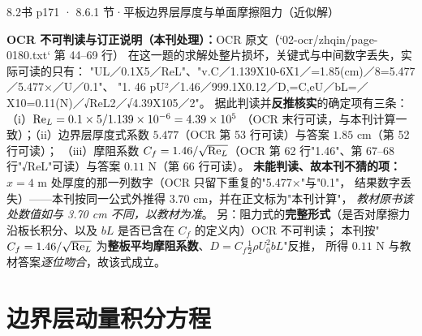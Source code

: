 \begin{liti}{8.2}{书 p171 · 8.6.1 节·平板边界层厚度与单面摩擦阻力（近似解）}
\begin{tishi}
\textbf{OCR 不可判读与订正说明（本刊处理）：}OCR 原文（`02-ocr/zhqin/page-0180.txt` 第 44--69 行）
在这一题的求解处整片损坏，关键式与中间数字丢失，实际可读的只有：
"UL／0.1X5／ReL"、"v.C／1.139X10-6X1／=1.85(cm)／8=5.477／5.477×／U／0.1"、
"1. 46 pU²／1.46／999.1X0.12／D,=C,eU／bL=／X10=0.11(N)／√ReL2／√4.39X105／2"。
据此判读并\textbf{反推核实}的确定项有三条：（i）$\mathrm{Re}_L=0.1\times5/1.139\times10^{-6}=4.39\times10^{5}$
（OCR 末行可读，与本刊计算一致）；（ii）边界层厚度式系数 $5.477$（OCR 第 53 行可读）与答案 $1.85$ cm（第 52 行可读）；
（iii）摩阻系数 $C_f=1.46/\sqrt{\mathrm{Re}_L}$（OCR 第 62 行"1.46"、第 67--68 行"√ReL"可读）与答案 $0.11$ N（第 66 行可读）。
\textbf{未能判读、故本刊不猜的项：}$x=4$ m 处厚度的那一列数字（OCR 只留下重复的"5.477×"与"0.1"，
结果数字丢失）——本刊按同一公式外推得 $3.70$ cm，并在正文标为"本刊计算"，
\emph{教材原书该处数值如与 3.70 cm 不同，以教材为准}。
另：阻力式的\textbf{完整形式}（是否对摩擦力沿板长积分、以及 $bL$ 是否已含在 $C_f$ 的定义内）OCR 不可判读；
本刊按"$C_f=1.46/\sqrt{\mathrm{Re}_L}$ 为\textbf{整板平均摩阻系数}、$D=C_f\frac12\rho U_0^2bL$"反推，
所得 $0.11$ N 与教材答案\emph{逐位吻合}，故该式成立。
\end{tishi}
\end{liti}

\section{边界层动量积分方程}

